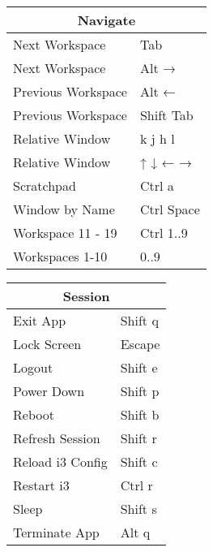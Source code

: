 \documentclass[12pt,paper=landscape,paper=a4]{scrartcl}
\begin{document}
\begin{multicols}{2}
    \vspace{1em}

    \begin{tabular}{ll}
         \multicolumn{2}{c}{Navigate}\\
         \hline
         Next Workspace     & \faWindows{} Tab\\
         Next Workspace     & \faWindows{} Alt →\\
         Previous Workspace & \faWindows{} Alt ←\\
         Previous Workspace & \faWindows{} Shift Tab\\
         Relative Window    & \faWindows{} k j h l\\
         Relative Window    & \faWindows{} ↑ ↓ ← →\\
         Scratchpad         & \faWindows{} Ctrl a\\
         Window by Name     & \faWindows{} Ctrl Space\\
         Workspace 11 - 19  & \faWindows{} Ctrl 1..9\\
         Workspaces 1-10    & \faWindows{} 0..9
    \end{tabular}

    \vspace{1em}

    \begin{tabular}{ll}
         \multicolumn{2}{c}{Session}\\
         \hline
         Exit App           & \faWindows{} Shift q\\
         Lock Screen        & \faWindows{} Escape\\
         Logout             & \faWindows{} Shift e\\
         Power Down         & \faWindows{} Shift p\\
         Reboot             & \faWindows{} Shift b\\
         Refresh Session    & \faWindows{} Shift r\\
         Reload i3 Config   & \faWindows{} Shift c\\
         Restart i3         & \faWindows{} Ctrl r\\
         Sleep              & \faWindows{} Shift s\\
         Terminate App      & \faWindows{} Alt q
    \end{tabular}

\end{multicols}
\end{document}
